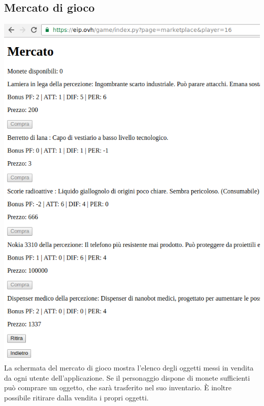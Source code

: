 \documentclass[10pt,a4paper]{article}
\begin{document}
\subsection{Mercato di gioco}
\includegraphics[scale=0.5]{7mercato}\\
La schermata del mercato di gioco mostra l'elenco degli oggetti messi in vendita da ogni utente dell'applicazione. Se il personaggio dispone di monete sufficienti può comprare un oggetto, che sarà trasferito nel suo inventario. È inoltre possibile ritirare dalla vendita i propri oggetti.
\end{document}
